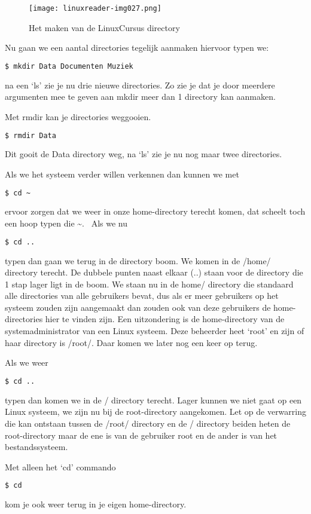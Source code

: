 \begin{figure}
\texttt{[image: linuxreader-img027.png]}
	\label{fig:CreateDirLinuxCursus}
	\caption{Het maken van de LinuxCursus directory}
\end{figure}

Nu gaan we een aantal directories tegelijk aanmaken hiervoor typen we:
\begin{lstlisting}[language=bash]
$ mkdir Data Documenten Muziek
\end{lstlisting}
na een `ls' zie je nu drie nieuwe directories. Zo zie je dat je door meerdere argumenten mee te
geven aan mkdir meer dan 1 directory kan aanmaken.

Met rmdir kan je directories weggooien.
\begin{lstlisting}[language=bash]
$ rmdir Data
\end{lstlisting}
Dit gooit de Data directory weg, na `ls' zie je nu nog maar twee directories.

Als we het systeem verder willen verkennen dan kunnen we met
\begin{lstlisting}[language=bash]
$ cd ~
\end{lstlisting}
ervoor zorgen dat we weer in onze home-directory terecht komen, dat scheelt toch een hoop typen die \~{}. \ Als we nu
\begin{lstlisting}[language=bash]
$ cd ..
\end{lstlisting}
typen dan gaan we terug in de directory boom. We komen in de /home/ directory terecht. De dubbele punten naast elkaar
(..) staan voor de directory die 1 stap lager ligt in de boom. We staan nu in de home/ directory die standaard alle
directories van alle gebruikers bevat, dus als er meer gebruikers op het systeem zouden zijn aangemaakt dan zouden ook
van deze gebruikers de home-directories hier te vinden zijn. Een uitzondering is de home-directory van de
systemadministrator van een Linux systeem. Deze beheerder heet `root' en zijn of haar directory is /root/. Daar komen
we later nog een keer op terug.

Als we weer
\begin{lstlisting}[language=bash]
$ cd ..
\end{lstlisting}
typen dan komen we in de / directory terecht. Lager kunnen we niet gaat op een Linux systeem, we zijn nu bij de
root-directory aangekomen. Let op de verwarring die kan ontstaan tussen de /root/ directory en de / directory beiden
heten de root-directory maar de ene is van de gebruiker root en de ander is van het bestandssysteem.

Met alleen het `cd' commando
\begin{lstlisting}[language=bash]
$ cd
\end{lstlisting}
kom je ook weer terug in je eigen home-directory.
